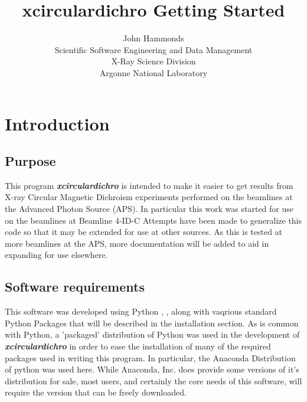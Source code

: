 \documentclass[12pt,letterpaper, openany]{book}
\begin{document}
\begin{titlepage}


\title{xcirculardichro Getting Started}
\author{John Hammonds \\
Scientific Software Engineering and Data Management \\
X-Ray Science Division \\
Argonne National Laboratory}


\end{titlepage}

\maketitle
\tableofcontents
\listoffigures
\chapter{Introduction}\label{chap:introduction}

\section{Purpose}\label{sec:purpose}
This program \textbf{\textit{xcirculardichro}} is intended to make it easier to
get results from X-ray Circular Magnetic Dichroism
\cite{Bouldi1} experiments
performed on the beamlines at the Advanced Photon Source
(APS)\cite{APS}.
In particular this work was started for use on the beamlines at Beamline 4-ID-C
\cite{FOUR-IDC}
Attempts have been made to generalize this code so that it may be extended for 
use at other sources.  As this is tested at more beamlines at the APS, more 
documentation will be added to aid in expanding for use elsewhere.

\section{Software requirements}\label{softwareReqs}
This software was developed using Python\textsuperscript{\textregistered}
\cite{PYTHONWEB}, \cite{PYTHONLANGREF}, along with vaqrious standard Python
Packages that will be described in the installation section.  As is common with
Python, a 'packaged' distribution of Python was used in the development of
\textbf{\textit{xcirculardichro}} in order to ease the installation of many of
the required packages used in writing this program.  In particular, the Anaconda
\cite{ANACONDAPYTHON}Distribution of python was used here.  While Anaconda, Inc.
does provide some versions of it's distribution for sale, most users, and
certainly the core needs of this software, will require the version that can be
freely downloaded.
\end{document}
